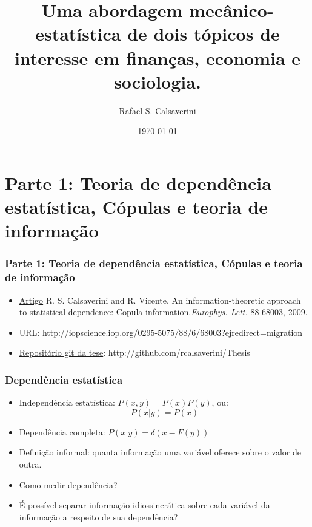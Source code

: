 \documentclass[ignorenonframetext,]{beamer}
\title[Tese]{Uma abordagem mecânico-estatística de dois tópicos de interesse em
       finanças, economia e sociologia.}
\author{Rafael S. Calsaverini}
\date{\today}
\begin{document}
\frame{\titlepage}

\begin{frame}
\tableofcontents[hideallsubsections]
\end{frame}

\begin{frame}



\end{frame}

\section{Parte 1: Teoria de dependência estatística, Cópulas e teoria de
informação}

\begin{frame}\frametitle{Parte 1: Teoria de dependência estatística,
Cópulas e teoria de informação}

\begin{itemize}
\itemsep1pt\parskip0pt
\item
  \href{http://iopscience.iop.org/0295-5075/88/6/68003?ejredirect=migration}{Artigo}
  R. S. Calsaverini and R. Vicente. An information-theoretic approach to
  statistical dependence: Copula information.\emph{Europhys. Lett.} 88
  68003, 2009.
\item
  URL:
  http://iopscience.iop.org/0295-5075/88/6/68003?ejredirect=migration
\item
  \href{https://github.com/rcalsaverini/Thesis}{Repositório git da
  tese}: http://github.com/rcalsaverini/Thesis
\end{itemize}

\end{frame}

\begin{frame}\frametitle{Dependência estatística}

\begin{itemize}
\itemsep1pt\parskip0pt
\item
  Independência estatística: $P(x,y) = P(x)P(y)$, ou:
  \[P(x\vert y) = P(x)\]
\item
  Dependência completa: $P(x\vert y) = \delta(x - F(y))$
\item
  Definição informal: quanta informação uma variável oferece sobre o
  valor de outra.
\item
  Como medir dependência?
\item
  É possível separar informação idiossincrática sobre cada variável da
  informação a respeito de sua dependência?
\end{itemize}

\end{frame}
\end{document}
